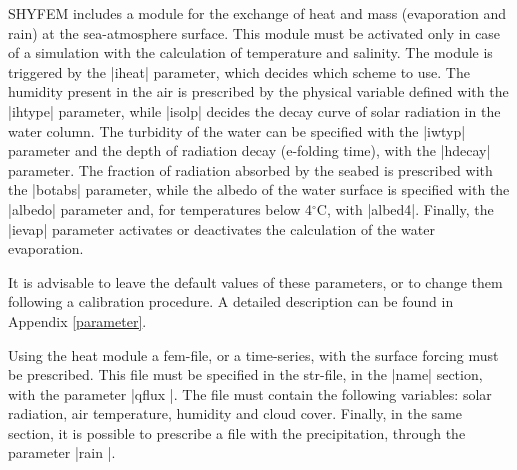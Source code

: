 
%
%
%
%
%
%
%
SHYFEM includes a module for the exchange of heat and mass (evaporation and rain) at the sea-atmosphere surface. This module must be activated only in case of a simulation with the calculation of temperature and salinity. The module is triggered by the |iheat| parameter, which decides which scheme to use. The humidity present in the air is prescribed by the physical variable defined with the |ihtype| parameter, while |isolp| decides the decay curve of solar radiation in the water column. The turbidity of the water can be specified with the |iwtyp| parameter and the depth of radiation decay (e-folding time), with the |hdecay| parameter. The fraction of radiation absorbed by the seabed is prescribed with the |botabs| parameter, while the albedo of the water 
surface is specified with the |albedo| parameter and, for temperatures below 4$^{\circ}$C, with |albed4|. Finally, the |ievap| parameter activates or deactivates the calculation of the water evaporation.

It is advisable to leave the default values of these parameters, or to change them following a calibration procedure. A detailed description can be found in Appendix \ref{parameter}.

Using the heat module a fem-file, or a time-series, with the surface forcing must be prescribed. This file must be specified in the str-file, in the |name| section, with the parameter |qflux |. The file must contain the following variables: solar radiation, air temperature, humidity and cloud cover. Finally, in the same section, it is possible to prescribe a file with the precipitation, through the parameter |rain |.
